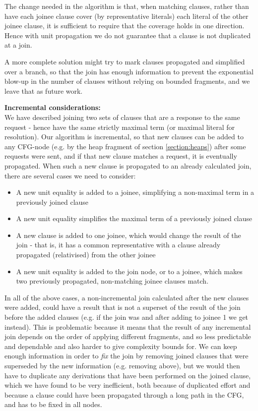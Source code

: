 The change needed in the algorithm is that, when matching clauses, rather than have each joinee clause cover (by representative literals) 
each literal of the other joinee clause, it is sufficient to require that the coverage holds in one direction. Hence with unit propagation we do not guarantee that a clause is not duplicated at a join.

A more complete solution might try to mark clauses propagated and simplified over a branch, 
so that the join has enough information to prevent the exponential blow-up in the number of clauses without relying on bounded fragments, and we leave that as future work.

\bigskip

\noindent
\textbf{Incremental considerations:}\\
We have described joining two sets of clauses that are a response to the same request - hence have the same strictly maximal term (or maximal literal for resolution).
Our algorithm is incremental, so that new clauses can be added to any CFG-node (e.g. by the heap fragment of section \ref{section:heaps}) after some requests were sent, and if that new clause matches a request, it is eventually propagated. 
When such a new clause is propagated to an already calculated join, there are several cases we need to consider:

\begin{itemize}
	\item A new unit equality is added to a joinee, simplifying a non-maximal term in a previously joined clause
	\item A new unit equality simplifies the maximal term of a previously joined clause
	\item A new clause is added to one joinee, which would change the result of the join - that is, it has a common representative with a clause already propagated (relativised) from the other joinee
	\item A new unit equality is added to the join node, or to a joinee, which makes two previously propagated, non-matching joinee clauses match.
\end{itemize}
In all of the above cases, a non-incremental join calculated after the new clauses were added, could have a result that is not a superset of the result of the join before the added clauses (e.g. if the join was 
and after adding  to joinee 1 we get  instead).
This is problematic because it means that the result of any incremental join depends on the order of applying different fragments, and so less predictable and dependable and also harder to give complexity bounds for.
We can keep enough information in order to \emph{fix} the join by removing joined clauses that were superseded by the new information 
(e.g. removing  above), but we would then have to duplicate any derivations that have been performed on the joined clause, which we have found to be very inefficient, both because of duplicated effort and because a clause could have been propagated through a long path in the CFG, and has to be fixed in all nodes.


